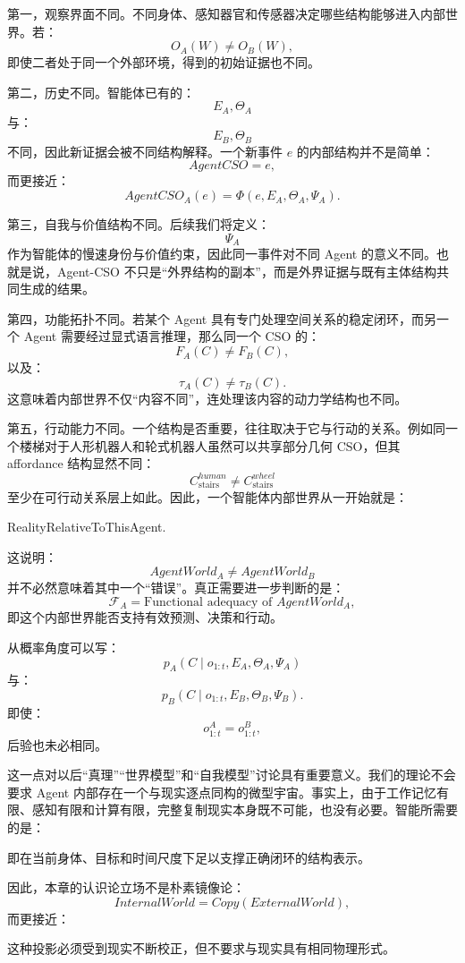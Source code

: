 第一，观察界面不同。不同身体、感知器官和传感器决定哪些结构能够进入内部世界。若：
\[
O_A(W)\neq O_B(W),
\]
即使二者处于同一个外部环境，得到的初始证据也不同。

第二，历史不同。智能体已有的：
\[
E_A,\Theta_A
\]
与：
\[
E_B,\Theta_B
\]
不同，因此新证据会被不同结构解释。一个新事件 $e$ 的内部结构并不是简单：
\[
AgentCSO=e,
\]
而更接近：
\[
AgentCSO_A(e)
=
\Phi(e,E_A,\Theta_A,\Psi_A).
\]

第三，自我与价值结构不同。后续我们将定义：
\[
\Psi_A
\]
作为智能体的慢速身份与价值约束，因此同一事件对不同 Agent 的意义不同。也就是说，Agent-CSO 不只是“外界结构的副本”，而是外界证据与既有主体结构共同生成的结果。

第四，功能拓扑不同。若某个 Agent 具有专门处理空间关系的稳定闭环，而另一个 Agent 需要经过显式语言推理，那么同一个 CSO 的：
\[
F_A(C)\neq F_B(C),
\]
以及：
\[
\tau_A(C)\neq\tau_B(C).
\]
这意味着内部世界不仅“内容不同”，连处理该内容的动力学结构也不同。

第五，行动能力不同。一个结构是否重要，往往取决于它与行动的关系。例如同一个楼梯对于人形机器人和轮式机器人虽然可以共享部分几何 CSO，但其 affordance 结构显然不同：
\[
C_{\text{stairs}}^{human}
\neq
C_{\text{stairs}}^{wheel}
\]
至少在可行动关系层上如此。因此，一个智能体内部世界从一开始就是：
\begin{statementbox}
RealityRelativeToThisAgent.
\end{statementbox}

这说明：
\[
AgentWorld_A
\neq
AgentWorld_B
\]
并不必然意味着其中一个“错误”。真正需要进一步判断的是：
\[
\mathcal F_A
=
\text{Functional adequacy of }AgentWorld_A,
\]
即这个内部世界能否支持有效预测、决策和行动。

从概率角度可以写：
\[
p_A(C\mid o_{1:t},E_A,\Theta_A,\Psi_A)
\]
与：
\[
p_B(C\mid o_{1:t},E_B,\Theta_B,\Psi_B).
\]
即使：
\[
o_{1:t}^{A}=o_{1:t}^{B},
\]
后验也未必相同。

这一点对以后“真理”“世界模型”和“自我模型”讨论具有重要意义。我们的理论不会要求 Agent 内部存在一个与现实逐点同构的微型宇宙。事实上，由于工作记忆有限、感知有限和计算有限，完整复制现实本身既不可能，也没有必要。智能所需要的是：
\begin{statementbox}
\centering
{}
\end{statementbox}
即在当前身体、目标和时间尺度下足以支撑正确闭环的结构表示。

因此，本章的认识论立场不是朴素镜像论：
\[
InternalWorld
=
Copy(ExternalWorld),
\]
而更接近：
\begin{statementbox}
\centering
{}
\end{statementbox}
这种投影必须受到现实不断校正，但不要求与现实具有相同物理形式。

